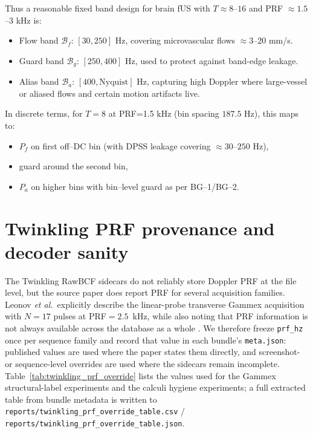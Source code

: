 \documentclass[11pt]{article}
\DeclareRobustCommand{\path}[1]{\nolinkurl{#1}}
\newcommand{\Pf}{P_f}
\newcommand{\Pa}{P_a}
\newcommand{\Cf}{\mathcal{B}_f}
\newcommand{\Ca}{\mathcal{B}_a}
\newcommand{\Cg}{\mathcal{B}_g}
\begin{document}
Thus a reasonable fixed band design for brain fUS with $T\approx 8$--$16$ and PRF $\approx 1.5$--$3$ kHz is:

\begin{itemize}[nosep]
  \item Flow band $\Cf$: $[30,250]$ Hz, covering microvascular flows $\approx 3$--$20$ mm/s.
  \item Guard band $\Cg$: $[250,400]$ Hz, used to protect against band-edge leakage.
  \item Alias band $\Ca$: $[400, \text{Nyquist}]$ Hz, capturing high Doppler where large-vessel or aliased flows and certain motion artifacts live.
\end{itemize}

In discrete terms, for $T=8$ at PRF=1.5 kHz (bin spacing $187.5$ Hz), this maps to:
\begin{itemize}[nosep]
  \item $\Pf$ on first off--DC bin (with DPSS leakage covering $\approx 30$--$250$ Hz),
  \item guard around the second bin,
  \item $\Pa$ on higher bins with bin--level guard as per BG--1/BG--2.
\end{itemize}

\section{Twinkling PRF provenance and decoder sanity}
\label{app:twinkling_prf_decode}

The Twinkling RawBCF sidecars do not reliably store Doppler PRF at the file level, but the source paper does report PRF for several acquisition families. Leonov \emph{et al.}\ explicitly describe the linear-probe transverse Gammex acquisition with $N=17$ pulses at PRF$=2.5$~kHz, while also noting that PRF information is not always available across the database as a whole \cite{LeonovTwinklingDD2021}. We therefore freeze \texttt{prf\_hz} once per sequence family and record that value in each bundle's \texttt{meta.json}: published values are used where the paper states them directly, and screenshot- or sequence-level overrides are used where the sidecars remain incomplete. Table~\ref{tab:twinkling_prf_override} lists the values used for the Gammex structural-label experiments and the calculi hygiene experiments; a full extracted table from bundle metadata is written to \path{reports/twinkling_prf_override_table.csv} / \path{reports/twinkling_prf_override_table.json}.
\end{document}
